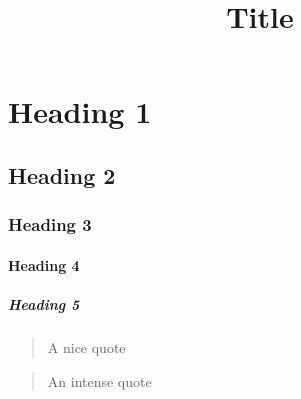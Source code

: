 \documentclass{article}
\title{Title}
\begin{document}
	\section{Heading 1}







	\subsection{Heading 2}







	\subsubsection{Heading 3}







	\paragraph{Heading 4}







	\subparagraph{Heading 5}









	\begin{quote}
		A nice quote
	\end{quote}



	\begin{quote}
		An intense quote
	\end{quote}
\end{document}

